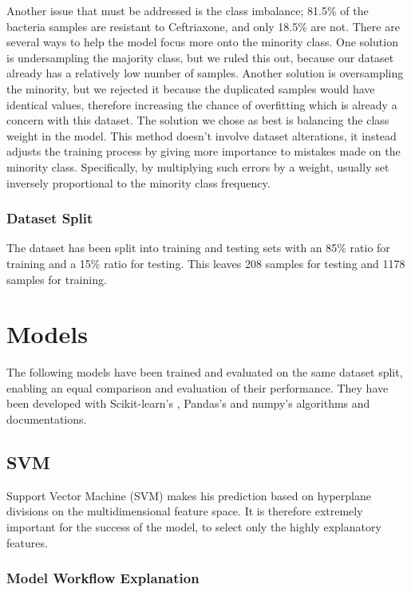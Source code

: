 \documentclass{article}
\begin{document}
Another issue that must be addressed is the class imbalance; 81.5\% of the bacteria samples are resistant to Ceftriaxone, and only 18.5\% are not. There are several ways to help the model focus more onto the minority class. One solution is undersampling the majority class, but we ruled this out, because our dataset already has a relatively low number of samples. Another solution is oversampling the minority, but we rejected it because the duplicated samples would have identical values, therefore increasing the chance of overfitting which is already a concern with this dataset. The solution we chose as best is balancing the class weight in the model. This method doesn't involve dataset alterations, it instead adjusts the training process by giving more importance to mistakes made on the minority class. Specifically, by multiplying such errors by a weight, usually set inversely proportional to the minority class frequency.

\subsubsection{Dataset Split}

The dataset has been split into training and testing sets with an 85\% ratio for training and a 15\% ratio for testing. This leaves 208 samples for testing and 1178 samples for training.

\section{Models}

The following models have been trained and evaluated on the same dataset split, enabling an equal comparison and evaluation of their performance. They have been developed with Scikit-learn's \citep{scikit-learn}, Pandas's \citep{pandas} and numpy's \citep{numpy} algorithms and documentations. 

\subsection{SVM}

Support Vector Machine (SVM) makes his prediction based on hyperplane divisions on the multidimensional feature space. It is therefore extremely important for the success of the model, to select only the highly explanatory features. 

\subsubsection{Model Workflow Explanation}
\end{document}
